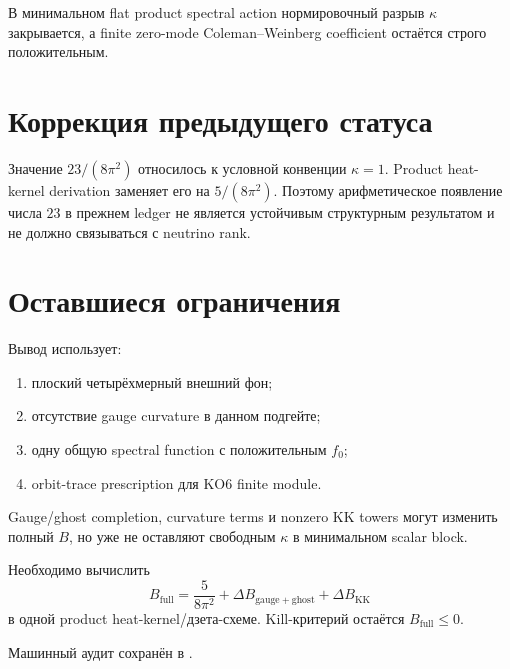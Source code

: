 \begin{proposition}
В минимальном flat product spectral action нормировочный разрыв
\(\kappa\) закрывается, а finite zero-mode Coleman--Weinberg coefficient
остаётся строго положительным.
\end{proposition}

\section{Коррекция предыдущего статуса}

Значение \(23/(8\pi^2)\) относилось к условной конвенции \(\kappa=1\).
Product heat-kernel derivation заменяет его на \(5/(8\pi^2)\). Поэтому
арифметическое появление числа \(23\) в прежнем ledger не является
устойчивым структурным результатом и не должно связываться с neutrino
rank.

\section{Оставшиеся ограничения}

Вывод использует:
\begin{enumerate}
 \item плоский четырёхмерный внешний фон;
 \item отсутствие gauge curvature в данном подгейте;
 \item одну общую spectral function с положительным \(f_0\);
 \item orbit-trace prescription для KO6 finite module.
\end{enumerate}
Gauge/ghost completion, curvature terms и nonzero KK towers могут изменить
полный \(B\), но уже не оставляют свободным \(\kappa\) в минимальном
scalar block.

\begin{protocol}
Необходимо вычислить
\begin{equation}
 B_{\mathrm{full}}
 =\frac5{8\pi^2}
 +\Delta B_{\mathrm{gauge+ghost}}
 +\Delta B_{\mathrm{KK}}
\end{equation}
в одной product heat-kernel/дзета-схеме. Kill-критерий остаётся
\(B_{\mathrm{full}}\le0\).
\end{protocol}

Машинный аудит сохранён в
.